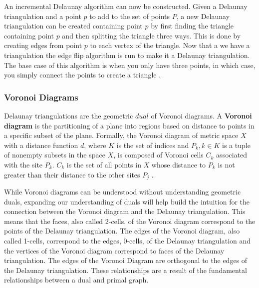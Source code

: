 \documentclass[11pt]{article}
\begin{document}
An incremental Delaunay algorithm can now be constructed. Given a Delaunay triangulation and a point $p$ to add to the set of points $P$, a new Delaunay triangulation can be created containing point $p$ by first finding the triangle containing point $p$ and then splitting the triangle three ways. This is done by creating edges from point $p$ to each vertex of the triangle. Now that a we have a triangulation the edge flip algorithm is run to make it a Delaunay triangulation. The base case of this algorithm is when you only have three points, in which case, you simply connect the points to create a triangle \cite{meshGeneration}. 

\subsubsection{Voronoi Diagrams}
Delaunay triangulations are the geometric $dual$ of Voronoi diagrams. A \textbf{Voronoi diagram} is the partitioning of a plane into regions based on distance to points in a specific subset of the plane. Formally, the Voronoi diagram of metric space $X$ with a distance function $d$, where $K$ is the set of indices and $P_k, k \in K$ is a tuple of nonempty subsets in the space $X$, is composed of Voronoi cells $C_k$ associated with the site $P_k$. $C_k$ is the set of all points in $X$ whose distance to $P_k$ is not greater than their distance to the other sites $P_j$ \cite{voronoiDiagrams}. 

While Voronoi diagrams can be understood without understanding geometric duals, expanding our understanding of duals will help build the intuition for the connection between the Voronoi diagram and the Delaunay triangulation. This means that the faces, also called 2-cells, of the Voronoi diagram correspond to the points of the Delaunay triangulation. The edges of the Voronoi diagram, also called 1-cells, correspond to the edges, 0-cells, of the Delaunay triangulation and the vertices of the Voronoi diagram correspond to faces of the Delaunay triangulation. The edges of the Voronoi Diagram are orthogonal to the edges of the Delaunay triangulation. These relationships are a result of the fundamental relationships between a dual and primal graph.
\end{document}
